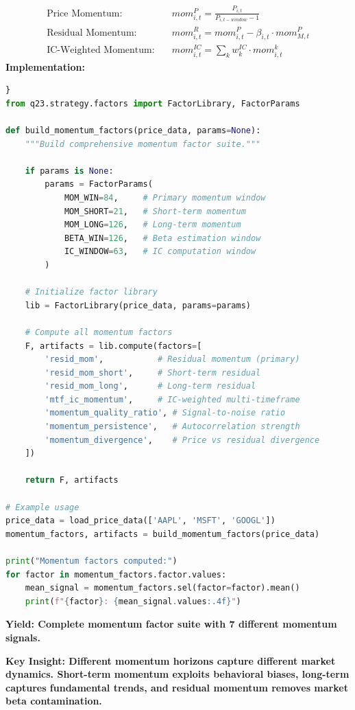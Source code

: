 \documentclass[11pt,letterpaper,openany]{book}
\begin{document}
\begin{align}
\text{Price Momentum:} \quad & mom_{i,t}^P = \frac{P_{i,t}}{P_{i,t-window} - 1} \\
\text{Residual Momentum:} \quad & mom_{i,t}^R = mom_{i,t}^P - \beta_{i,t} \cdot mom_{M,t}^P \\
\text{IC-Weighted Momentum:} \quad & mom_{i,t}^{IC} = \sum_k w_k^{IC} \cdot mom_{i,t}^k
\end{align}
\textbf{Implementation:}
\begin{lstlisting}[language=Python,caption=Q23 Momentum Factor Implementation]}
from q23.strategy.factors import FactorLibrary, FactorParams

def build_momentum_factors(price_data, params=None):
    """Build comprehensive momentum factor suite."""
    
    if params is None:
        params = FactorParams(
            MOM_WIN=84,     # Primary momentum window
            MOM_SHORT=21,   # Short-term momentum
            MOM_LONG=126,   # Long-term momentum
            BETA_WIN=126,   # Beta estimation window
            IC_WINDOW=63,   # IC computation window
        )
    
    # Initialize factor library
    lib = FactorLibrary(price_data, params=params)
    
    # Compute all momentum factors
    F, artifacts = lib.compute(factors=[
        'resid_mom',           # Residual momentum (primary)
        'resid_mom_short',     # Short-term residual
        'resid_mom_long',      # Long-term residual
        'mtf_ic_momentum',     # IC-weighted multi-timeframe
        'momentum_quality_ratio', # Signal-to-noise ratio
        'momentum_persistence',   # Autocorrelation strength
        'momentum_divergence',    # Price vs residual divergence
    ])
    
    return F, artifacts

# Example usage
price_data = load_price_data(['AAPL', 'MSFT', 'GOOGL'])
momentum_factors, artifacts = build_momentum_factors(price_data)

print("Momentum factors computed:")
for factor in momentum_factors.factor.values:
    mean_signal = momentum_factors.sel(factor=factor).mean()
    print(f"{factor}: {mean_signal.values:.4f}")
\end{lstlisting}
\textbf{Yield: Complete momentum factor suite with 7 different momentum signals.}

\textbf{Key Insight: Different momentum horizons capture different market dynamics. Short-term momentum exploits behavioral biases, long-term captures fundamental trends, and residual momentum removes market beta contamination.}
\end{document}
